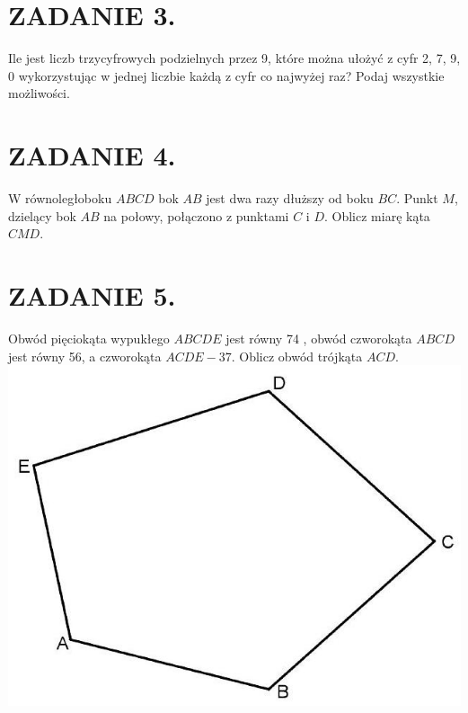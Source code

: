 \documentclass[10pt]{article}
\begin{document}
\section*{ZADANIE 3.}
Ile jest liczb trzycyfrowych podzielnych przez 9, które można ułożyć z cyfr 2, 7, 9, 0 wykorzystując w jednej liczbie każdą z cyfr co najwyżej raz? Podaj wszystkie możliwości.

\section*{ZADANIE 4.}
W równoległoboku \(A B C D\) bok \(A B\) jest dwa razy dłuższy od boku \(B C\). Punkt \(M\), dzielący bok \(A B\) na połowy, połączono z punktami \(C\) i \(D\). Oblicz miarę kąta \(C M D\).

\section*{ZADANIE 5.}
Obwód pięciokąta wypukłego \(A B C D E\) jest równy 74 , obwód czworokąta \(A B C D\) jest równy 56, a czworokąta \(A C D E-37\). Oblicz obwód trójkąta \(A C D\).\\
\includegraphics[max width=\textwidth, center]{2024_11_21_71e9dc1a1f07adbf8fc8g-1(1)}
\end{document}
